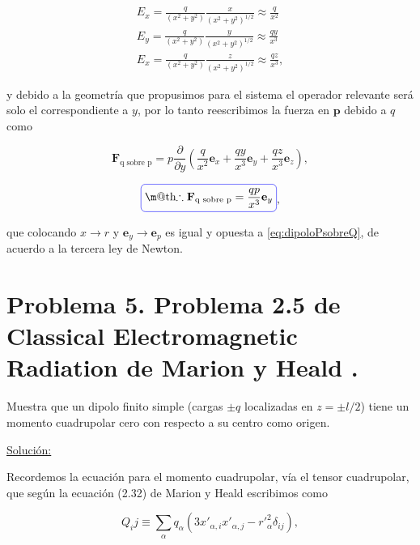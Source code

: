 \documentclass[a4paper,11pt]{article}
\makeatletter
\numberwithin{equation}{section}
\newcommand*{\boxcolor}{blue}
\renewcommand{\boxed}[1]{\textcolor{\boxcolor}{%
\tikz[baseline={([yshift=-1ex]current bounding box.center)}] \node [rectangle, minimum width=1ex,rounded corners,draw] {\normalcolor\m@th$\displaystyle#1$};}}
\makeatother
\begin{document}
\begin{align*}
 E_x = \frac{q}{(x^2+y^2)}\frac{x}{(x^2+y^2)^{1/2}} \approx \frac{q}{x^2} \\
 E_y = \frac{q}{(x^2+y^2)}\frac{y}{(x^2+y^2)^{1/2}} \approx \frac{qy}{x^3} \\
 E_x = \frac{q}{(x^2+y^2)}\frac{z}{(x^2+y^2)^{1/2}} \approx \frac{qz}{x^3},
\end{align*}

y debido a la geometría que propusimos para el sistema el operador relevante 
será solo el correspondiente a $y$, por lo tanto reescribimos la fuerza en 
$\mathbf{p}$ debido a $q$ como 

\begin{equation}
 \mathbf{F}_{\text{q sobre p}} = p\frac{\partial}{\partial y}\left( \frac{q}{x^2} 
 \mathbf{e}_x + \frac{qy}{x^3}\mathbf{e}_y + \frac{qz}{x^3}\mathbf{e}_z\right),
\end{equation}
 
\begin{equation}
 \boxed{\therefore  \mathbf{F}_{\text{q sobre p}} = \frac{qp}{x^3}\mathbf{e}_y},
\end{equation}

que colocando $x \rightarrow r$ y $\mathbf{e}_y \rightarrow \mathbf{e}_p$ es igual y 
opuesta a \eqref{eq:dipoloPsobreQ}, de acuerdo a la tercera ley de Newton.

\newpage

\section{Problema 5. Problema 2.5 de Classical Electromagnetic Radiation
de Marion y Heald \cite{marion2}.}

Muestra que un dipolo finito simple (cargas $\pm q$ localizadas en $z = \pm l/2$) 
tiene un momento cuadrupolar cero con respecto a su centro como origen.

\vspace{.3cm}

\underline{Solución:} \vspace{.3cm}

Recordemos la ecuación para el momento cuadrupolar, vía el tensor cuadrupolar, 
que según la ecuación (2.32) de Marion y Heald \cite{marion2} escribimos como 

\begin{equation}
 Q_ij \equiv \sum_\alpha q_\alpha(3x'_{\alpha,i}x'_{\alpha,j} - r'^2_\alpha\delta_{ij}),
\end{equation}
\end{document}
